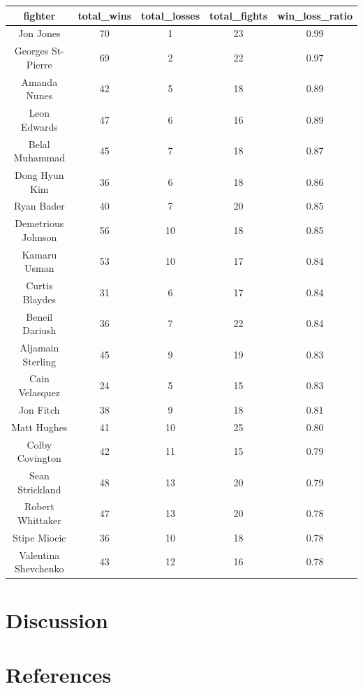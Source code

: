 \documentclass[
  man,floatsintext]{apa6}
\begin{document}
\begin{tabular}{c|c|c|c|c}
\hline
fighter & total\_wins & total\_losses & total\_fights & win\_loss\_ratio\\
\hline
Jon Jones & 70 & 1 & 23 & 0.99\\
\hline
Georges St-Pierre & 69 & 2 & 22 & 0.97\\
\hline
Amanda Nunes & 42 & 5 & 18 & 0.89\\
\hline
Leon Edwards & 47 & 6 & 16 & 0.89\\
\hline
Belal Muhammad & 45 & 7 & 18 & 0.87\\
\hline
Dong Hyun Kim & 36 & 6 & 18 & 0.86\\
\hline
Ryan Bader & 40 & 7 & 20 & 0.85\\
\hline
Demetrious Johnson & 56 & 10 & 18 & 0.85\\
\hline
Kamaru Usman & 53 & 10 & 17 & 0.84\\
\hline
Curtis Blaydes & 31 & 6 & 17 & 0.84\\
\hline
Beneil Dariush & 36 & 7 & 22 & 0.84\\
\hline
Aljamain Sterling & 45 & 9 & 19 & 0.83\\
\hline
Cain Velasquez & 24 & 5 & 15 & 0.83\\
\hline
Jon Fitch & 38 & 9 & 18 & 0.81\\
\hline
Matt Hughes & 41 & 10 & 25 & 0.80\\
\hline
Colby Covington & 42 & 11 & 15 & 0.79\\
\hline
Sean Strickland & 48 & 13 & 20 & 0.79\\
\hline
Robert Whittaker & 47 & 13 & 20 & 0.78\\
\hline
Stipe Miocic & 36 & 10 & 18 & 0.78\\
\hline
Valentina Shevchenko & 43 & 12 & 16 & 0.78\\
\hline
\end{tabular}

\hypertarget{discussion}{%
\section{Discussion}\label{discussion}}

\newpage

\hypertarget{references}{%
\section{References}\label{references}}
\end{document}
